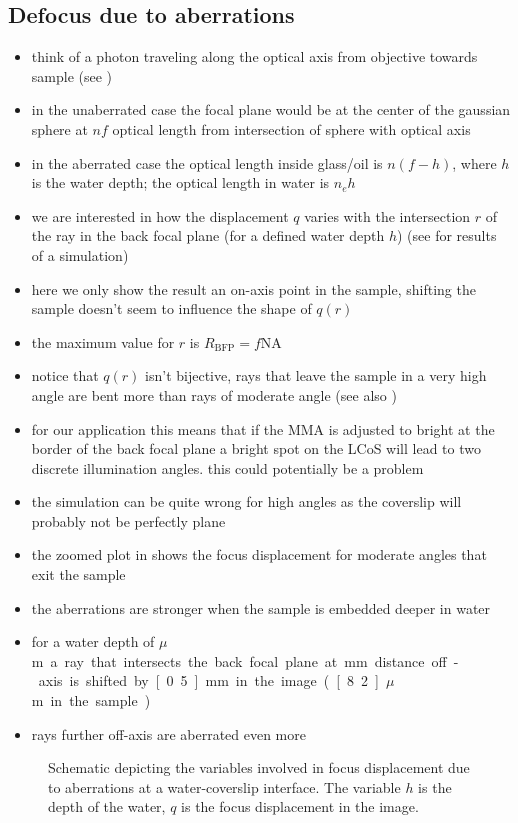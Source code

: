 \subsection{Defocus due to aberrations}
\begin{itemize}
\item think of a photon traveling along the optical axis from
  objective towards sample (see )
\item in the unaberrated case the focal plane would be at the center
  of the gaussian sphere at $nf$ optical length from intersection of sphere
  with optical axis
\item in the aberrated case the optical length inside glass/oil is $n(f-h)$,
  where $h$ is the water depth; the optical length in water is $n_eh$
\item we are interested in how the displacement $q$ varies with the
  intersection $r$ of the ray in the back focal plane (for a defined
  water depth $h$) (see  for results of
  a simulation)
\item here we only show the result an on-axis point in the sample,
  shifting the sample doesn't seem to influence the shape of $q(r)$
\item the maximum value for $r$ is $R_\textrm{BFP}=f\textrm{NA}$
\item notice that $q(r)$ isn't bijective, rays that leave the sample
  in a very high angle are bent more than rays of moderate angle (see
  also )
\item {\color{red}for our application this means that if the MMA is
    adjusted to bright at the border of the back focal plane a bright
    spot on the LCoS will lead to two discrete illumination angles.}
  this could potentially be a problem
\item the simulation can be quite wrong for high angles as the
  coverslip will probably not be perfectly plane
\item the zoomed plot in  shows
  the focus displacement for moderate angles that exit the sample
\item the aberrations are stronger when the sample is embedded deeper
  in water
\item for a water depth of \unit[100]{$\mu$m} a ray that intersects
  the back focal plane at \unit[2]{mm} distance off-axis is shifted by
  \unit[0.5]{mm} in the image (\unit[8.2]{$\mu$m} in the sample)
\item rays further off-axis are aberrated even more
\end{itemize}
\begin{figure}
   \centering
   
   \caption{Schematic depicting the variables involved in focus
     displacement due to aberrations at a water-coverslip
     interface. The variable $h$ is the depth of the water, $q$ is the
     focus displacement in the image.}
   \label{fig:aberration-sketch}
 \end{figure}
 
